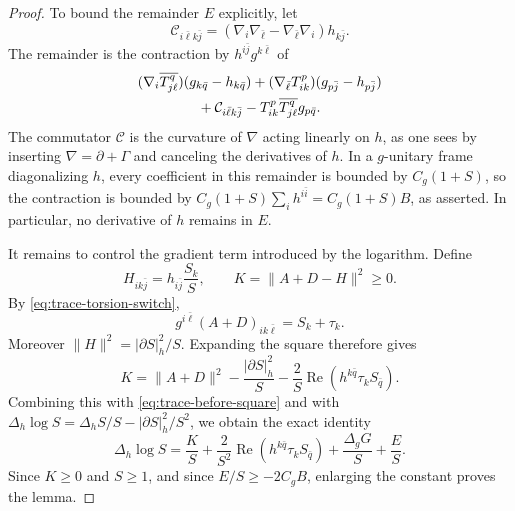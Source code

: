 \begin{proof}
To bound the remainder $E$ explicitly, let
\[
 \mathcal C_{i\bar\ell k\bar j}
  =(\nabla_i\nabla_{\bar\ell}-\nabla_{\bar\ell}\nabla_i)h_{k\bar j}.
\]
The remainder is the contraction by $h^{i\bar j}g^{k\bar\ell}$ of
\[
 \begin{split}
 &(\nabla_i\overline{T_{j\ell}^q})(g_{k\bar q}-h_{k\bar q})
 +(\nabla_{\bar\ell}T_{ik}^p)(g_{p\bar j}-h_{p\bar j})\\
 &\hspace{15mm}+\mathcal C_{i\bar\ell k\bar j}
              -T_{ik}^p\overline{T_{j\ell}^q}g_{p\bar q}.
 \end{split}
\]
The commutator $\mathcal C$ is the curvature of $\nabla$ acting linearly on $h$, as one sees by inserting $\nabla=\partial+\Gamma$ and canceling the derivatives of $h$. In a $g$-unitary frame diagonalizing $h$, every coefficient in this remainder is bounded by $C_g(1+S)$, so the contraction is bounded by $C_g(1+S)\sum_i h^{i\bar i}=C_g(1+S)B$, as asserted. In particular, no derivative of $h$ remains in $E$.

It remains to control the gradient term introduced by the logarithm. Define
\[
 H_{ik\bar j}=h_{i\bar j}\frac{S_k}{S},\qquad
 K=\|A+D-H\|^2\geq0.
\]
By \eqref{eq:trace-torsion-switch},
\[
 g^{i\bar\ell}(A+D)_{ik\bar\ell}=S_k+\tau_k.
\]
Moreover $\|H\|^2=|\partial S|_h^2/S$. Expanding the square therefore gives
\[
 K=\|A+D\|^2-\frac{|\partial S|_h^2}{S}
       -\frac2S\operatorname{Re}(h^{k\bar q}\tau_kS_{\bar q}).
\]
Combining this with \eqref{eq:trace-before-square} and with $\Delta_h\log S=\Delta_hS/S-|\partial S|_h^2/S^2$, we obtain the exact identity
\[
 \Delta_h\log S=\frac KS+
 \frac2{S^2}\operatorname{Re}(h^{k\bar q}\tau_kS_{\bar q})
 +\frac{\Delta_gG}{S}+\frac ES.
\]
Since $K\geq0$ and $S\geq1$, and since $E/S\geq-2C_gB$, enlarging the constant proves the lemma.
\end{proof}

